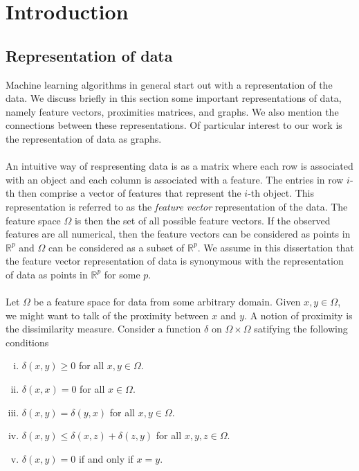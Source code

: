 \chapter{Introduction}
\label{cha:introduction}

\section{Representation of data}
\label{sec:representation-data}
Machine learning algorithms in general start out with a representation
of the data. We discuss briefly in this section some important
representations of data, namely feature vectors, proximities matrices,
and graphs. We also mention the connections between these
representations. Of particular interest to our work is the
representation of data as graphs. \\ \\
%
%
\noindent An intuitive way of respresenting data is as a matrix where
each row is associated with an object and each column is associated
with a feature. The entries in row $i$-th then comprise a vector of
features that represent the $i$-th object. This representation is
referred to as the \emph{feature vector} representation of the
data. The feature space $\Omega$ is then the set of all possible
feature vectors. If the observed features are all numerical, then the
feature vectors can be considered as points in $\mathbb{R}^{p}$ and
$\Omega$ can be considered as a subset of $\mathbb{R}^{p}$. We assume
in this dissertation that the feature vector representation of data is
synonymous with the representation of data as points in
$\mathbb{R}^{p}$ for some $p$. \\ \\
%
%
\noindent 
Let $\Omega$ be a feature space for data from some arbitrary
domain. Given $x, y \in \Omega$, we might want to talk of the
proximity between $x$ and $y$. A notion of proximity is the
dissimilarity measure. Consider a function $\delta$ on $\Omega
\times \Omega$ satifying the following conditions
\begin{enumerate}[(i)]
\item $\delta(x,y) \geq 0$ for all $x, y \in \Omega$.
\item $\delta(x,x) = 0$ for all $x \in \Omega$.
\item $\delta(x,y) = \delta(y,x)$ for all $x, y \in \Omega$.
\item $\delta(x,y) \leq \delta(x,z) + \delta(z,y)$ for all $x,y,z \in \Omega$.
\item $\delta(x,y) = 0$ if and only if $x = y$. 
\end{enumerate}
